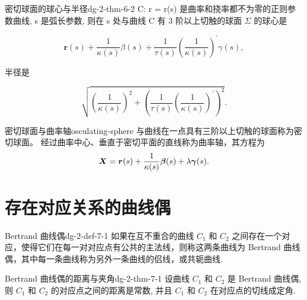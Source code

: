 \begin{theorem}{密切球面的球心与半径}{dg-2-thm-6-2}
C: r = r(s) 是曲率和挠率都不为零的正则参数曲线, s 是弧长参数, 则在 s 处与曲线 C 有 3 阶以上切触的球面  \(\Sigma\)  的球心是\par

\begin{equation*}
\boldsymbol {r} (s) + \frac {1}{\kappa (s)} \beta (s) + \frac {1}{\tau (s)} \left(\frac {1}{\kappa (s)}\right) ^ {\prime} \gamma (s),
\end{equation*}

半径是\par

\begin{equation*}
\sqrt {\left(\frac {1}{\kappa (s)}\right) ^ {2} + \left(\frac {1}{\tau (s)} \left(\frac {1}{\kappa (s)}\right) ^ {\prime}\right) ^ {2}}.
\end{equation*}
\end{theorem}

\begin{definition}{密切球面与曲率轴}{osculating-sphere}
与曲线在一点具有三阶以上切触的球面称为密切球面。
经过曲率中心、垂直于密切平面的直线称为曲率轴，其方程为
\[
\boldsymbol{X}=\boldsymbol{r}(s)+\frac1{\kappa(s)}\boldsymbol{\beta}(s)+\lambda\boldsymbol{\gamma}(s).
\]
\end{definition}

\section{存在对应关系的曲线偶}

\begin{definition}{Bertrand 曲线偶}{dg-2-def-7-1}
如果在互不重合的曲线  \(C_{1}\)  和  \(C_{2}\)  之间存在一个对应，使得它们在每一对对应点有公共的主法线，则称这两条曲线为 Bertrand 曲线偶，其中每一条曲线称为另外一条曲线的侣线，或共轭曲线.
\end{definition}

\begin{theorem}{Bertrand 曲线偶的距离与夹角}{dg-2-thm-7-1}
设曲线  \(C_{1}\)  和  \(C_{2}\)  是 Bertrand 曲线偶, 则  \(C_{1}\)  和  \(C_{2}\)  的对应点之间的距离是常数, 并且  \(C_{1}\)  和  \(C_{2}\)  在对应点的切线成定角.
\end{theorem}

